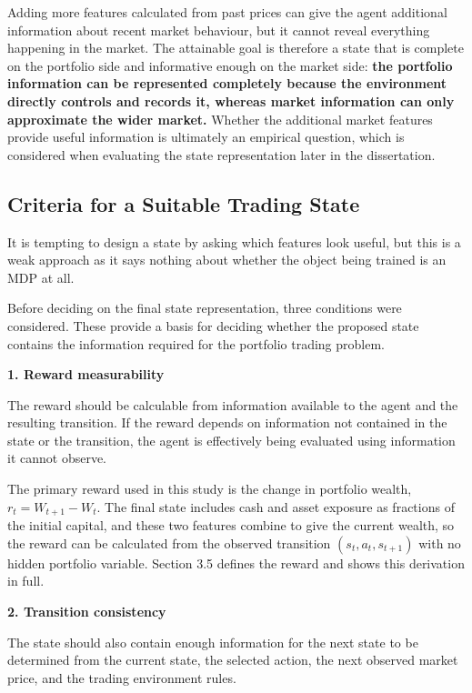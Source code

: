Adding more features calculated from past prices can give the agent
additional information about recent market behaviour, but it cannot
reveal everything happening in the market. The attainable goal is
therefore a state that is complete on the portfolio side and
informative enough on the market side: \textbf{the portfolio information can be
represented completely because the environment directly controls and
records it, whereas market information can only approximate the wider
market.} Whether the additional market features provide useful
information is ultimately an empirical question, which is considered
when evaluating the state representation later in the dissertation.

\subsection{Criteria for a Suitable Trading State}

It is tempting to design a state by asking which features look useful,
but this is a weak approach as it says nothing about whether the object
being trained is an MDP at all.

Before deciding on the final state representation, three conditions were
considered. These provide a basis for deciding whether the proposed
state contains the information required for the portfolio trading
problem.

\textbf{1. Reward measurability}

The reward should be calculable from information available to the agent
and the resulting transition. If the reward depends on information not
contained in the state or the transition, the agent is effectively being
evaluated using information it cannot observe.

The primary reward used in this study is the change in portfolio wealth,
\(r_{t} = W_{t + 1} - W_{t}\). The final state includes cash and asset
exposure as fractions of the initial capital, and these two features
combine to give the current wealth, so the reward can be calculated
from the observed transition \((s_{t},a_{t},s_{t + 1})\) with no hidden
portfolio variable. Section 3.5 defines the reward and shows this
derivation in full.

\textbf{2. Transition consistency}

The state should also contain enough information for the next state to
be determined from the current state, the selected action, the next
observed market price, and the trading environment rules.

